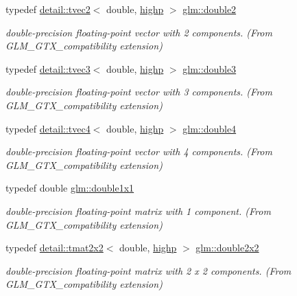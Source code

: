 \begin{DoxyCompactItemize}
typedef \hyperlink{structglm_1_1detail_1_1tvec2}{detail\+::tvec2}$<$ double, \hyperlink{namespaceglm_a0f04f086094c747d227af4425893f545ac6f7eab42eacbb10d59a58e95e362074}{highp} $>$ \hyperlink{group__gtx__compatibility_ga227d30a4fa630c9e3fb6c7ea87250c62}{glm\+::double2}
\begin{DoxyCompactList}\small\item\em double-\/precision floating-\/point vector with 2 components. (From G\+L\+M\+\_\+\+G\+T\+X\+\_\+compatibility extension) \end{DoxyCompactList}\item 
typedef \hyperlink{structglm_1_1detail_1_1tvec3}{detail\+::tvec3}$<$ double, \hyperlink{namespaceglm_a0f04f086094c747d227af4425893f545ac6f7eab42eacbb10d59a58e95e362074}{highp} $>$ \hyperlink{group__gtx__compatibility_ga3b94d4a19ca0272cad6e025fc5150d06}{glm\+::double3}
\begin{DoxyCompactList}\small\item\em double-\/precision floating-\/point vector with 3 components. (From G\+L\+M\+\_\+\+G\+T\+X\+\_\+compatibility extension) \end{DoxyCompactList}\item 
typedef \hyperlink{structglm_1_1detail_1_1tvec4}{detail\+::tvec4}$<$ double, \hyperlink{namespaceglm_a0f04f086094c747d227af4425893f545ac6f7eab42eacbb10d59a58e95e362074}{highp} $>$ \hyperlink{group__gtx__compatibility_ga1edf736b418528a2fc87d826f7697b9d}{glm\+::double4}
\begin{DoxyCompactList}\small\item\em double-\/precision floating-\/point vector with 4 components. (From G\+L\+M\+\_\+\+G\+T\+X\+\_\+compatibility extension) \end{DoxyCompactList}\item 
typedef double \hyperlink{group__gtx__compatibility_ga1c87d3042377335eb050a20ab0ec148a}{glm\+::double1x1}
\begin{DoxyCompactList}\small\item\em double-\/precision floating-\/point matrix with 1 component. (From G\+L\+M\+\_\+\+G\+T\+X\+\_\+compatibility extension) \end{DoxyCompactList}\item 
typedef \hyperlink{structglm_1_1detail_1_1tmat2x2}{detail\+::tmat2x2}$<$ double, \hyperlink{namespaceglm_a0f04f086094c747d227af4425893f545ac6f7eab42eacbb10d59a58e95e362074}{highp} $>$ \hyperlink{group__gtx__compatibility_ga75cfac00b48c51f4b677151f789b8547}{glm\+::double2x2}
\begin{DoxyCompactList}\small\item\em double-\/precision floating-\/point matrix with 2 x 2 components. (From G\+L\+M\+\_\+\+G\+T\+X\+\_\+compatibility extension) \end{DoxyCompactList}\item 

\end{DoxyCompactItemize}
